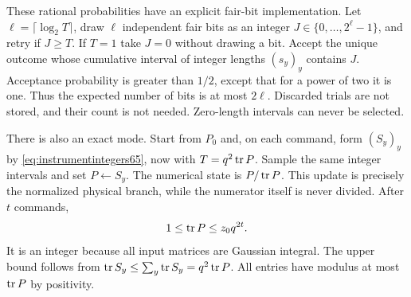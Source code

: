 These rational probabilities have an explicit fair-bit implementation.
Let $\ell=\lceil\log_2T\rceil$, draw $\ell$ independent fair bits as an
integer $J\in\{0,\ldots,2^\ell-1\}$, and retry if $J\ge T$. If $T=1$
take $J=0$ without drawing a bit. Accept the unique outcome whose
cumulative interval of integer lengths $(s_y)_y$ contains $J$.
Acceptance probability is greater than $1/2$, except that for a power
of two it is one. Thus the expected number of bits is at most $2\ell$.
Discarded trials are not stored, and their count is not needed.
Zero-length intervals can never be selected.

There is also an exact mode. Start from $P_0$ and, on each command,
form $(S_y)_y$ by \eqref{eq:instrumentintegers65}, now with
$T=q^2\operatorname{tr} P$. Sample the same integer intervals and set $P\leftarrow S_y$.
The numerical state is $P/\operatorname{tr} P$. This update is precisely the
normalized physical branch, while the numerator itself is never
divided. After $t$ commands,
\begin{equation}\label{eq:exacttrace65}
                      1\le\operatorname{tr} P\le z_0 q^{2t}.
\end{equation}
It is an integer because all input matrices are Gaussian integral.
The upper bound follows from
$\operatorname{tr} S_y\le\sum_y\operatorname{tr} S_y=q^2\operatorname{tr} P$.
All entries have modulus at most $\operatorname{tr} P$ by positivity.

